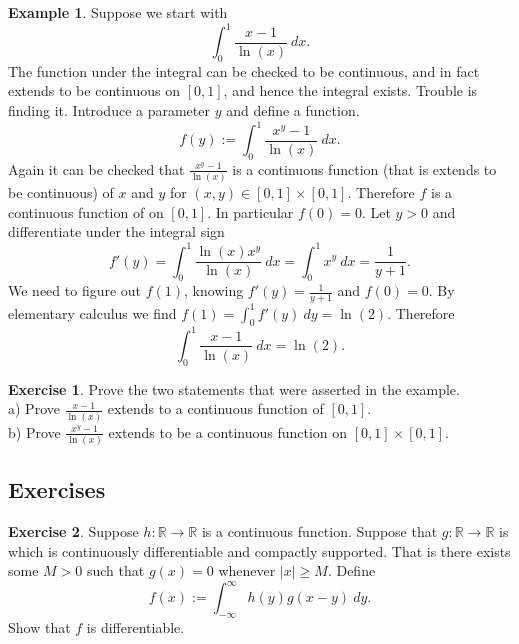 \documentclass[12pt]{book}
\newcommand{\abs}[1]{\left\lvert {#1} \right\rvert}
\newcommand{\R}{{\mathbb{R}}}
\theoremstyle{plain}
\theoremstyle{remark}
\theoremstyle{definition}
\theoremstyle{exercise}
\newtheorem{exercise}{Exercise}[section]
\theoremstyle{example}
\newtheorem{example}[thm]{Example}
\begin{document}
\begin{example}
Suppose we start with
\begin{equation*}
\int_0^{1} \frac{x-1}{\ln(x)} ~dx .
\end{equation*}
The function under the integral can be checked to be continuous, and in fact
extends to be continuous on $[0,1]$, and hence
the integral exists.  Trouble is finding it.  Introduce a parameter $y$
and define a function.
\begin{equation*}
f(y) := \int_0^{1} \frac{x^y-1}{\ln(x)} ~dx .
\end{equation*}
Again it can be checked that
$\frac{x^y-1}{\ln(x)}$
is a continuous function (that is extends to be continuous) of $x$ and $y$ for $(x,y) \in [0,1] \times [0,1]$.  Therefore
$f$ is a continuous function of on $[0,1]$.  In particular $f(0) = 0$.
Let $y >0$ and differentiate under the integral sign
\begin{equation*}
f'(y) =
\int_0^{1} \frac{\ln(x) x^y}{\ln(x)} ~dx 
=
\int_0^{1} x^y ~dx =
\frac{1}{y+1} .
\end{equation*}
We need to figure out $f(1)$, knowing $f'(y) = \frac{1}{y+1}$ and $f(0) =
0$.  By elementary calculus we find $f(1) = \int_0^1 f'(y)~dy = \ln(2)$.  Therefore
\begin{equation*}
\int_0^{1} \frac{x-1}{\ln(x)} ~dx  = \ln(2).
\end{equation*}
\end{example}

\begin{exercise}
Prove the two statements that were asserted in the example.\\
a) Prove $\frac{x-1}{\ln(x)}$ extends to a continuous function of
$[0,1]$.\\
b) Prove $\frac{x^y-1}{\ln(x)}$ extends to be a continuous function
on $[0,1] \times [0,1]$.
\end{exercise}

\subsection{Exercises}

\begin{exercise}
Suppose $h \colon \R \to \R$ is a continuous function.  Suppose that $g
\colon \R \to \R$ is which is continuously differentiable and compactly
supported.  That is there exists some $M > 0$ such that $g(x) = 0$ whenever
$\abs{x} \geq M$.  Define
\begin{equation*}
f(x) := \int_{-\infty}^\infty h(y)g(x-y)~dy  .
\end{equation*}
Show that $f$ is differentiable.
\end{exercise}
\end{document}

